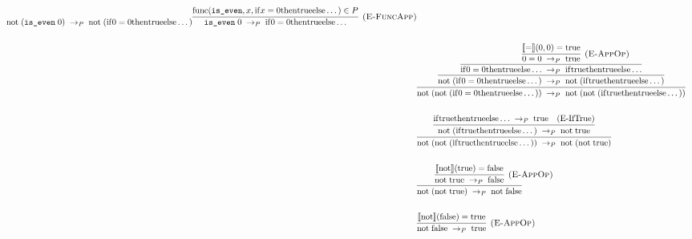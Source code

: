 \begin{align*}
{{      \Reduce{P}
        {\App{\mathrm{not}}{\paren{\App{\code{is\_even}}{0}}}}
        {\App{\mathrm{not}}{\paren
          {\If{0 = 0}{\true}{\dots}}
        }}
    } {
      \infer[\ERuleAppFunc] {
        \Reduce{P}
          {\App{\code{is\_even}}{0}}
          {\If{0 = 0}{\true}{\dots}}
      } {
        \Func{\code{is\_even}}{x}{\If{x = 0}{\true}{\dots}} \in P
      }
    }
  } \\\\
  & \infer {
    \Reduce{P}
        {\App{\mathrm{not}}{\paren{\App{\mathrm{not}}{\paren
          {\If{0 = 0}{\true}{\dots}}
        }}}}
        {\App{\mathrm{not}}{\paren{\App{\mathrm{not}}{\paren
          {\If{\true}{\true}{\dots}}
        }}}}
  } {
    \infer {
      \Reduce{P}
        {\App{\mathrm{not}}{\paren{\If{0 = 0}{\true}{\dots}}}}
        {\App{\mathrm{not}}{\paren{\If{\true}{\true}{\dots}}}}
    } {
      \infer {
        \Reduce{P}
          {\If{0 = 0}{\true}{\dots}}
          {\If{\true}{\true}{\dots}}
      } {
        \infer[\ERuleAppOp] {
          \Reduce{P}{0 = 0}{\true}
        } {
          \sem{=}\paren{0, 0} = \true
        }
      }
    }
  } \\\\
  & \infer {
    \Reduce{P}
      {\App{\mathrm{not}}{\paren{\App{\mathrm{not}}{\paren
          {\If{\true}{\true}{\dots}}
      }}}}
      {\App{\mathrm{not}}{\paren{\App{\mathrm{not}}{\true}}}}
  } {
    \infer {
      \Reduce{P}
        {\App{\mathrm{not}}{\paren{\If{\true}{\true}{\dots}}}}
        {\App{\mathrm{not}}{\true}}
    } {
      \Reduce{P}
        {\If{\true}{\true}{\dots}}
        {\true} \quad \ERuleIfTrue
    }
  } \\\\
  & \infer {
    \Reduce{P}
      {\App{\mathrm{not}}{\paren{\App{\mathrm{not}}{\true}}}}
      {\App{\mathrm{not}}{\false}}
  } {
    \infer[\ERuleAppOp] {
      \Reduce{P}
        {\App{\mathrm{not}}{\true}}
        {\false}
    } {
      \sem{\mathrm{not}}\paren{\true} = \false
    }
  } \\\\
  & \infer[\ERuleAppOp] {
    \Reduce{P}{\App{\mathrm{not}}{\false}}{\true}
  } {
    \sem{\mathrm{not}}\paren{\false} = \true
  }
\end{align*}
